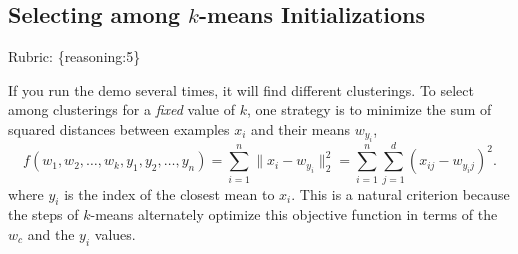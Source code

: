 \documentclass{article}
\def\gre#1{{\color{gre}#1}}
\def\norm#1{\|#1\|}
\def\rubric#1{\gre{Rubric: \{#1\}}}{}
\begin{document}
\subsection{Selecting among $k$-means Initializations}
\rubric{reasoning:5}

If you run the demo several times, it will find different clusterings. To select among clusterings for a \emph{fixed} value of $k$, one strategy is to minimize the sum of squared distances between examples $x_i$ and their means $w_{y_i}$,
\[
f(w_1,w_2,\dots,w_k,y_1,y_2,\dots,y_n) = \sum_{i=1}^n \norm{x_i - w_{y_i}}_2^2 = \sum_{i=1}^n \sum_{j=1}^d (x_{ij} - w_{y_ij})^2.
\]
 where $y_i$ is the index of the closest mean to $x_i$. This is a natural criterion because the steps of $k$-means alternately optimize this objective function in terms of the $w_c$ and the $y_i$ values.
\end{document}
